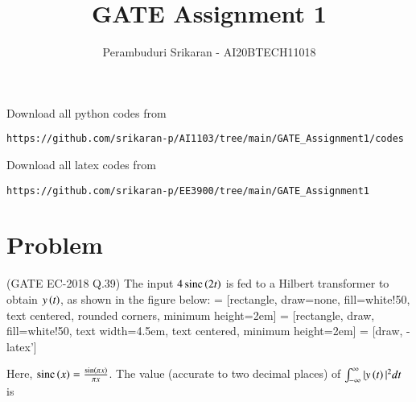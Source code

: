 \documentclass[journal,12pt,twocolumn]{IEEEtran}
\DeclareMathOperator{\sinc}{sinc}
\begin{document}
\makeatletter
{}
\makeatother
\let\StandardTheFigure\thefigure
\let\vec\mathbf
\renewcommand{\thefigure}{\theproblem}
\def\putbox#1#2#3{\makebox[0in][l]{\makebox[#1][l]{}\raisebox{\baselineskip}[0in][0in]{\raisebox{#2}[0in][0in]{#3}}}}
     \def\rightbox#1{\makebox[0in][r]{#1}}
     \def\centbox#1{\makebox[0in]{#1}}
     \def\topbox#1{\raisebox{-\baselineskip}[0in][0in]{#1}}
     \def\midbox#1{\raisebox{-0.5\baselineskip}[0in][0in]{#1}}
\vspace{3cm}
\title{GATE Assignment 1}
\author{Perambuduri Srikaran - AI20BTECH11018}
\maketitle
\newpage
\bigskip
\renewcommand{\thefigure}{\theenumi}
\renewcommand{\thetable}{\theenumi}
Download all python codes from
\begin{lstlisting}
https://github.com/srikaran-p/AI1103/tree/main/GATE_Assignment1/codes
\end{lstlisting}
Download all latex codes from
\begin{lstlisting}
https://github.com/srikaran-p/EE3900/tree/main/GATE_Assignment1
\end{lstlisting}
\section*{Problem}
(GATE EC-2018 Q.39) The input $4\sinc{\brak{2t}}$ is fed to a Hilbert transformer to obtain $y\left(t\right)$, as shown in the figure below:
 = [rectangle, draw=none, fill=white!50,
    text centered, rounded corners, minimum height=2em]
 = [rectangle, draw, fill=white!50,
    text width=4.5em, text centered, minimum height=2em]
 = [draw, -latex']
\begin{center}
\end{center}
Here, $\sinc{\brak{x}} = \frac{\sin\brak{\pi x}}{\pi x}$. The value (accurate to two decimal places) of $\int_{-\infty}^{\infty} |y\left(t\right)|^2 dt$ is
\end{document}
